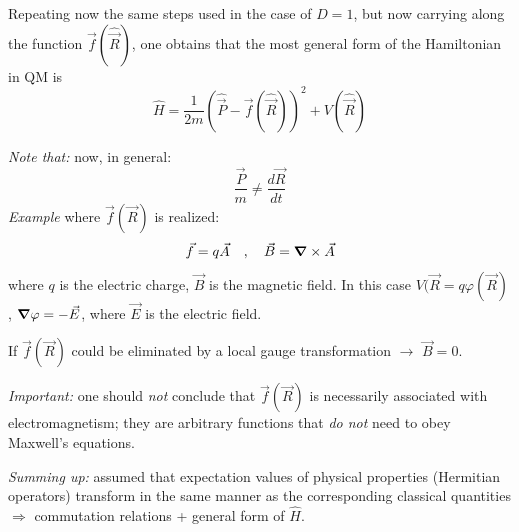\documentclass[12pt]{article}
\newcommand{\be}{\begin{equation}}
\newcommand{\ee}{\end{equation}}
\begin{document}
Repeating now the same steps used in the
case of $D=1$, but now carrying along the
function $\vec{f}(\hat{\vec{R}})$, one obtains that the most
general form of the Hamiltonian in QM is
\be
\hat{H} = \frac{1}{2m}
\left(
\hat{\vec{P}} - \vec{f}(\hat{\vec{R}})
\right)^2
+V(\hat{\vec{R}})
\ee

\emph{Note that:} now, in general:
\be
\frac{\vec{P}}{m} \neq \frac{d\vec{R}}{dt}
\ee
\emph{Example} where $\vec{f}(\vec{R})$ is realized:
\[
\vec{f} = q\vec{A}\quad,\quad\vec{B} = \grad\times\vec{A}
\]
where $q$ is the electric charge, $\vec{B}$ is the magnetic field.
In this case $V(\vec{R} = q \varphi(\vec{R})$, $\grad\varphi = -\vec{E}$, where $\vec{E}$ is the electric field.

If $\vec{f}(\vec{R})$  could be eliminated by a local gauge
transformation $\rightarrow$ $\vec{B} = 0$.


\emph{Important:} one should \emph{not} conclude that
$\vec{f}(\vec{R})$ is necessarily associated with electromagnetism;
they are arbitrary functions that \emph{do not} need to
obey Maxwell's equations.


\emph{Summing up:} assumed that expectation values
of physical properties (Hermitian operators) transform
in the same manner as the corresponding classical quantities
$\Rightarrow$ commutation relations + general form of $\hat{H}$.
\end{document}
